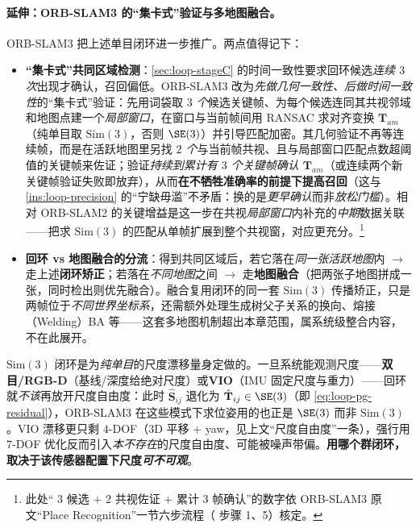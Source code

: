 \paragraph{延伸：ORB-SLAM3 的“集卡式”验证与多地图融合。}
ORB-SLAM3 把上述单目闭环进一步推广\cite{campos2021orbslam3}。两点值得记下：
\begin{itemize}
  \item \textbf{“集卡式”共同区域检测}：\cref{sec:loop-stageC} 的时间一致性要求回环候选\emph{连续 $3$ 次}出现才确认，召回偏低。ORB-SLAM3 改为\emph{先做几何一致性、后做时间一致性}的“集卡式”验证：先用词袋取\emph{ $3$ 个}候选关键帧、为每个候选连同其共视邻域和地图点建一个\emph{局部窗口}，在窗口与当前帧间用 RANSAC 求对齐变换 $\mathbf T_{am}$（纯单目取 $\mathrm{Sim}(3)$，否则 $\SE(3)$）并引导匹配加密\cite{campos2021orbslam3}。其几何验证不再等连续帧，而是在活跃地图里另找\emph{ $2$ 个}与当前帧共视、且与局部窗口匹配点数超阈值的关键帧来佐证；验证\emph{持续到累计有 $3$ 个关键帧确认 $\mathbf T_{am}$}（或连续两个新关键帧验证失败即放弃），从而\textbf{在不牺牲准确率的前提下提高召回}（这与 \cref{ins:loop-precision} 的“宁缺毋滥”不矛盾：换的是\emph{更早确认}而非\emph{放松门槛}）。相对 ORB-SLAM2 的关键增益是这一步在共视\emph{局部窗口}内补充的\emph{中期}数据关联——把求 $\mathrm{Sim}(3)$ 的匹配从单帧扩展到整个共视窗，对应更充分。\footnote{此处“ $3$ 候选 $+$ $2$ 共视佐证 $+$ 累计 $3$ 帧确认”的数字依 ORB-SLAM3 原文“Place Recognition”一节六步流程（\cite{campos2021orbslam3} 步骤 1、5）核定。}
  \item \textbf{回环 vs 地图融合的分流}：得到共同区域后，若它落在\emph{同一张活跃地图}内 $\to$ 走上述\textbf{闭环矫正}；若落在\emph{不同地图}之间 $\to$ 走\textbf{地图融合}（把两张子地图拼成一张，同时检出则优先融合）。融合复用闭环的同一套 $\mathrm{Sim}(3)$ 传播矫正，只是两帧位于\emph{不同世界坐标系}，还需额外处理生成树父子关系的换向、熔接（Welding）BA 等——这套多地图机制超出本章范围，属系统级整合内容，不在此展开。
\end{itemize}

\begin{pitfall}
$\mathrm{Sim}(3)$ 闭环是为\emph{纯单目}的尺度漂移量身定做的。一旦系统能观测尺度——\textbf{双目/RGB-D}（基线/深度给绝对尺度）或\textbf{VIO}（IMU 固定尺度与重力）——回环就\emph{不该}再放开尺度自由度：此时 $\hat{\mathbf S}_{ij}$ 退化为 $\hat{\mathbf T}_{ij}\in\SE(3)$（即 \cref{eq:loop-pg-residual}），ORB-SLAM3 在这些模式下求位姿用的也正是 $\SE(3)$ 而非 $\mathrm{Sim}(3)$\cite{campos2021orbslam3}。VIO 漂移更只剩 $4$-DOF（$3$D 平移 $+$ yaw，见上文“尺度自由度”一条），强行用 $7$-DOF 优化反而引入\emph{本不存在}的尺度自由度、可能被噪声带偏。\textbf{用哪个群闭环，取决于该传感器配置下尺度\emph{可不可观}}。
\end{pitfall}

